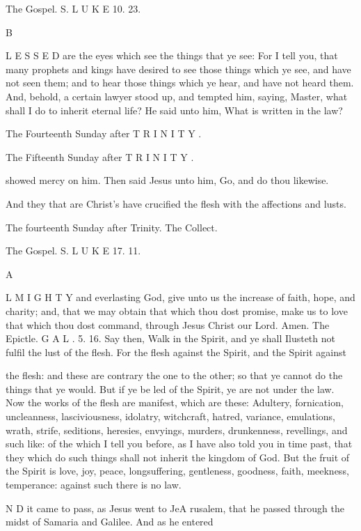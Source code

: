 The Gospel. S. L U K E 10. 23.

B

L E S S E D are the eyes which see the things that ye see: For I tell you, that many prophets and kings have desired to see those things which ye see, and have not seen them; and to hear those things which ye hear, and have not heard them. And, behold, a certain lawyer stood up, and tempted him, saying, Master, what shall I do to inherit eternal life? He said unto him, What is written in the law?

The Fourteenth Sunday after T R I N I T Y .

The Fifteenth Sunday after T R I N I T Y .

showed mercy on him. Then said Jesus unto him, Go, and do thou likewise.

And they that are Christ’s have crucified the flesh with the affections and lusts.

The fourteenth Sunday after Trinity. The Collect.

The Gospel. S. L U K E 17. 11.

A

L M I G H T Y and everlasting God, give unto us the increase of faith, hope, and charity; and, that we may obtain that which thou dost promise, make us to love that which thou dost command, through Jesus Christ our Lord. Amen. The Epictle. G A L . 5. 16. Say then, Walk in the Spirit, and ye shall Ilusteth not fulfil the lust of the flesh. For the flesh against the Spirit, and the Spirit against

the flesh: and these are contrary the one to the other; so that ye cannot do the things that ye would. But if ye be led of the Spirit, ye are not under the law. Now the works of the flesh are manifest, which are these: Adultery, fornication, uncleanness, lasciviousness, idolatry, witchcraft, hatred, variance, emulations, wrath, strife, seditions, heresies, envyings, murders, drunkenness, revellings, and such like: of the which I tell you before, as I have also told you in time past, that they which do such things shall not inherit the kingdom of God. But the fruit of the Spirit is love, joy, peace, longsuffering, gentleness, goodness, faith, meekness, temperance: against such there is no law.

N D it came to pass, as Jesus went to JeA rusalem, that he passed through the midst of Samaria and Galilee. And as he entered

